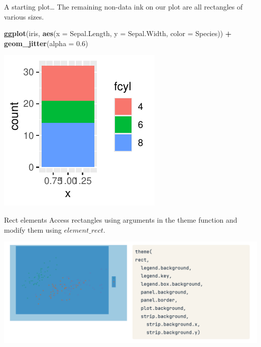 \documentclass[
  ignorenonframetext,
]{beamer}
\newenvironment{Shaded}{\begin{snugshade}}{\end{snugshade}}
\newcommand{\AttributeTok}[1]{\textcolor[rgb]{0.13,0.29,0.53}{#1}}
\newcommand{\FloatTok}[1]{\textcolor[rgb]{0.00,0.00,0.81}{#1}}
\newcommand{\FunctionTok}[1]{\textcolor[rgb]{0.13,0.29,0.53}{\textbf{#1}}}
\newcommand{\NormalTok}[1]{#1}
\newcommand{\SpecialCharTok}[1]{\textcolor[rgb]{0.81,0.36,0.00}{\textbf{#1}}}
\begin{document}
\begin{frame}[fragile]{A starting plot\ldots{}}
\label{a-starting-plot-3}
The remaining non-data ink on our plot are all rectangles of various
sizes.


\begin{Shaded}
\begin{Highlighting}[]
\FunctionTok{ggplot}\NormalTok{(iris, }\FunctionTok{aes}\NormalTok{(}\AttributeTok{x =}\NormalTok{ Sepal.Length, }\AttributeTok{y =}\NormalTok{ Sepal.Width, }\AttributeTok{color =}\NormalTok{ Species)) }\SpecialCharTok{+}
    \FunctionTok{geom\_jitter}\NormalTok{(}\AttributeTok{alpha =} \FloatTok{0.6}\NormalTok{)}
\end{Highlighting}
\end{Shaded}

\begin{center}\includegraphics[width=0.5\linewidth]{Figs/unnamed-chunk-65-1} \end{center}
\end{frame}

\begin{frame}{Rect elements}
\label{rect-elements}
Access rectangles using arguments in the theme function and modify them
using \(element\_rect\).

\includegraphics{../images/im214.png}
\end{frame}
\end{document}
